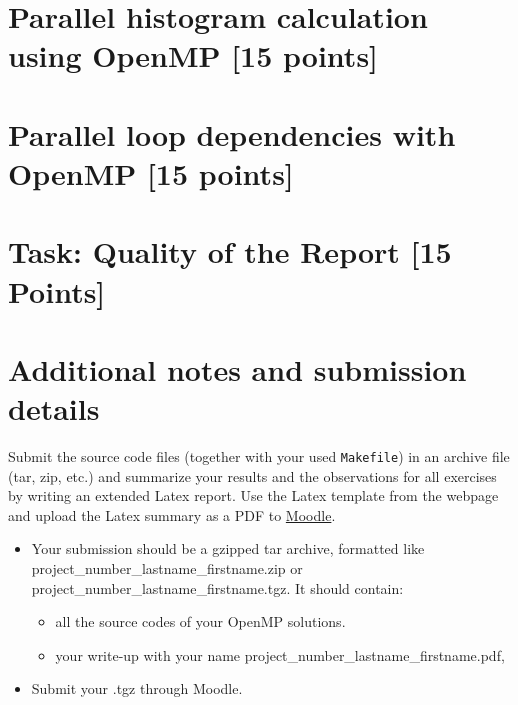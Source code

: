 \documentclass[unicode,11pt,a4paper,oneside,numbers=endperiod,openany]{scrartcl}
\begin{document}
\section{Parallel histogram calculation using OpenMP [15 points]}



\section{Parallel loop dependencies with OpenMP [15 points]}


\section{Task:  Quality of the Report   [15 Points]}


\section*{Additional notes and submission details}
Submit the source code files (together with your used \texttt{Makefile}) in
an archive file (tar, zip, etc.) and summarize your results and the
observations for all exercises by writing an extended Latex report.
Use the Latex template from the webpage and upload the Latex summary
as a PDF to \href{https://moodle-app2.let.ethz.ch/course/view.php?id=14316}{Moodle}.

\begin{itemize}
\item Your submission should be a gzipped tar archive, formatted like project\_number\_lastname\_firstname.zip or project\_number\_lastname\_firstname.tgz. 
      It should contain:
  \begin{itemize}
    \item all the source codes of your OpenMP solutions.
    \item your write-up with your name  project\_number\_lastname\_firstname.pdf, 
  \end{itemize}
   \item Submit your .tgz through Moodle.
  \end{itemize}
\end{document}

